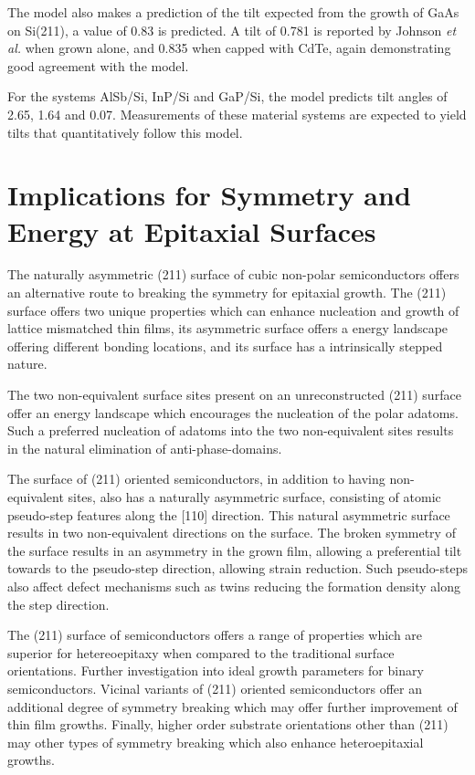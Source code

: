 The model also makes a prediction of the tilt expected from the growth of GaAs on Si(211), a value of 0.83\degree{} is predicted.
A tilt of 0.781\degree{} is reported by Johnson \textit{et al.}\cite{Johnson2011} when grown alone, and 0.835\degree{} when capped with CdTe, again demonstrating good agreement with the model.

For the systems AlSb/Si, InP/Si and GaP/Si, the model predicts tilt angles of 2.65\degree{}, 1.64\degree{} and 0.07\degree{}.
Measurements of these material systems are expected to yield tilts that quantitatively follow this model.
\section{Implications for Symmetry and Energy at Epitaxial Surfaces}
The naturally asymmetric (211) surface of cubic non-polar semiconductors offers an alternative route to breaking the symmetry for epitaxial growth.
The (211) surface offers two unique properties which can enhance nucleation and growth of lattice mismatched thin films, its asymmetric surface offers a energy landscape offering different bonding locations, and its surface has a intrinsically stepped nature.

The two non-equivalent surface sites present on an unreconstructed (211) surface offer an energy landscape which encourages the nucleation of the polar adatoms.
Such a preferred nucleation of adatoms into the two non-equivalent sites results in the natural elimination of anti-phase-domains.

The surface of (211) oriented semiconductors, in addition to having non-equivalent sites, also has a naturally asymmetric surface, consisting of atomic pseudo-step features along the [110] direction.
This natural asymmetric surface results in two non-equivalent directions on the surface.
The broken symmetry of the surface results in an asymmetry in the grown film, allowing a preferential tilt towards to the pseudo-step direction, allowing strain reduction.
Such pseudo-steps also affect defect mechanisms such as twins reducing the formation density along the step direction.

The (211) surface of semiconductors offers a range of properties which are superior for hetereoepitaxy when compared to the traditional surface orientations.
Further investigation into ideal growth parameters for binary semiconductors.
Vicinal variants of (211) oriented semiconductors offer an additional degree of symmetry breaking which may offer further improvement of thin film growths.
Finally, higher order substrate orientations other than (211) may other types of symmetry breaking which also enhance heteroepitaxial growths.
